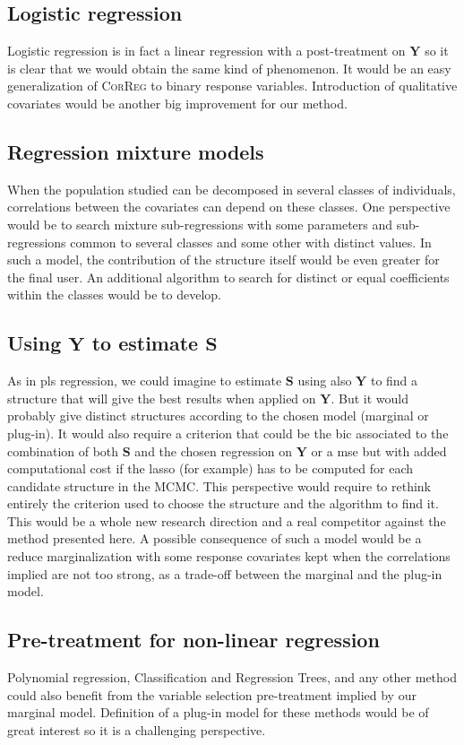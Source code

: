 \documentclass[12pt,a4paper]{report}
\begin{document}
		\subsection{Logistic regression}
			Logistic regression \cite{hosmer2000applied} is in fact a linear regression with a post-treatment on $\boldsymbol{Y}$ so it is clear that we would obtain the same kind of phenomenon. It would be an easy generalization of \textsc{CorReg} to binary response variables. Introduction of qualitative covariates would be another big improvement for our method.
			\subsection{Regression mixture models}
			When the population studied can be decomposed in several classes of individuals, correlations between the covariates can depend on these classes. One perspective would be to search mixture sub-regressions \cite{de1989mixtures} with some parameters and sub-regressions common to several classes and some other with distinct values. In such a model, the contribution of the structure itself would be even greater for the final user. An additional algorithm to search for distinct or equal coefficients within the classes would be to develop.
			\subsection{Using $\boldsymbol{Y}$ to estimate $\boldsymbol{S}$}
			As in {\sc pls} regression, we could imagine to estimate $\boldsymbol{S}$ using also $\boldsymbol{Y}$ to find a structure that will give the best results when applied on $\boldsymbol{Y}$. But it would probably give distinct structures according to the chosen model (marginal or plug-in). It would also require a criterion that could be the {\sc bic} associated to the combination of both $\boldsymbol{S}$ and the chosen regression on $\boldsymbol{Y}$ or a {\sc mse}  but with added computational cost if the {\sc lasso} (for example) has to be computed for each candidate structure in the MCMC. This perspective would require to rethink entirely the criterion used to choose the structure and the algorithm to find it. This would be a whole new research direction and a real competitor against the method presented here. A possible consequence of such a model would be a reduce marginalization with some response covariates kept when the correlations implied are not too strong, as a trade-off between the marginal and the plug-in model.
		\subsection{Pre-treatment for non-linear regression}
			Polynomial regression, Classification and Regression Trees, and any other method could also benefit from the variable selection pre-treatment implied by our marginal model. Definition of a plug-in model for these methods would be of great interest so it is a challenging perspective.
\end{document}
